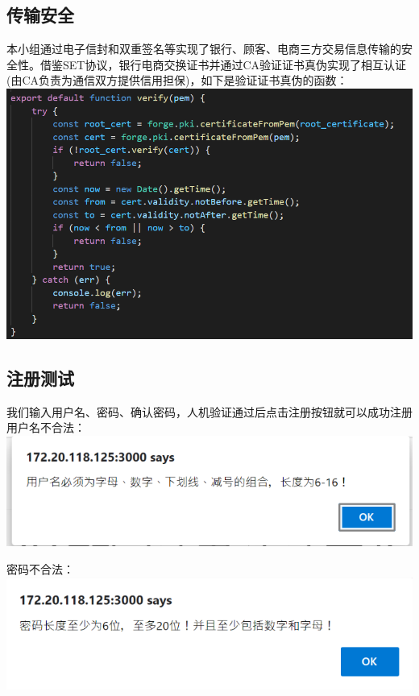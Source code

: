 \documentclass{ctexart}
\begin{document}
\subsection{传输安全}
本小组通过电子信封和双重签名等实现了银行、顾客、电商三方交易信息传输的安全性。借鉴SET协议，银行电商交换证书并通过CA验证证书真伪实现了相互认证(由CA负责为通信双方提供信用担保)，如下是验证证书真伪的函数：\\

\includegraphics[width=\textwidth]{verify.PNG}

\subsection{注册测试}
我们输入用户名、密码、确认密码，人机验证通过后点击注册按钮就可以成功注册
用户名不合法：\\

\includegraphics[width=\textwidth]{Clipboard_2021-01-02-14-11-07.png}


密码不合法：\\

\includegraphics[width=\textwidth]{Clipboard_2021-01-02-14-12-08.png}
\end{document}

